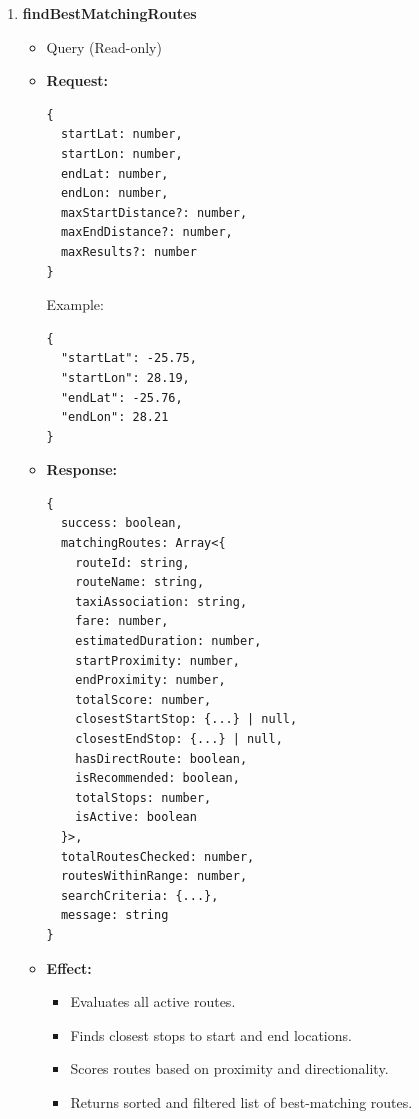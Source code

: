 \documentclass[a4paper,12pt]{article}
\begin{document}
\begin{enumerate}
  \item \textbf{findBestMatchingRoutes}
  \begin{itemize}
    \item Query (Read-only)
    \item \textbf{Request:}
    \begin{verbatim}
{
  startLat: number,
  startLon: number,
  endLat: number,
  endLon: number,
  maxStartDistance?: number,
  maxEndDistance?: number,
  maxResults?: number
}
    \end{verbatim}
    Example:
    \begin{verbatim}
{
  "startLat": -25.75,
  "startLon": 28.19,
  "endLat": -25.76,
  "endLon": 28.21
}
    \end{verbatim}
    \item \textbf{Response:}
    \begin{verbatim}
{
  success: boolean,
  matchingRoutes: Array<{
    routeId: string,
    routeName: string,
    taxiAssociation: string,
    fare: number,
    estimatedDuration: number,
    startProximity: number,
    endProximity: number,
    totalScore: number,
    closestStartStop: {...} | null,
    closestEndStop: {...} | null,
    hasDirectRoute: boolean,
    isRecommended: boolean,
    totalStops: number,
    isActive: boolean
  }>,
  totalRoutesChecked: number,
  routesWithinRange: number,
  searchCriteria: {...},
  message: string
}
    \end{verbatim}
    \item \textbf{Effect:}
    \begin{itemize}
      \item Evaluates all active routes.
      \item Finds closest stops to start and end locations.
      \item Scores routes based on proximity and directionality.
      \item Returns sorted and filtered list of best-matching routes.
    \end{itemize}
  \end{itemize}


\end{enumerate}
\end{document}
